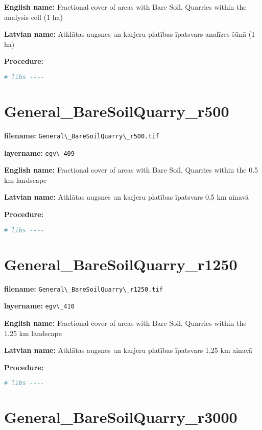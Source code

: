 \documentclass[
]{book}
\newcommand{\passthrough}[1]{#1}
\begin{document}
\textbf{English name:} Fractional cover of areas with Bare Soil, Quarries within the analysis cell (1 ha)

\textbf{Latvian name:} Atklātas augsnes un karjeru platības īpatsvars analīzes šūnā (1 ha)

\textbf{Procedure:}

\begin{lstlisting}[language=R]
# libs ----
\end{lstlisting}

\section{General\_BareSoilQuarry\_r500}\label{ch06.409}

\textbf{filename:} \passthrough{\lstinline!General\_BareSoilQuarry\_r500.tif!}

\textbf{layername:} \passthrough{\lstinline!egv\_409!}

\textbf{English name:} Fractional cover of areas with Bare Soil, Quarries within the 0.5 km landscape

\textbf{Latvian name:} Atklātas augsnes un karjeru platības īpatsvars 0,5 km ainavā

\textbf{Procedure:}

\begin{lstlisting}[language=R]
# libs ----
\end{lstlisting}

\section{General\_BareSoilQuarry\_r1250}\label{ch06.410}

\textbf{filename:} \passthrough{\lstinline!General\_BareSoilQuarry\_r1250.tif!}

\textbf{layername:} \passthrough{\lstinline!egv\_410!}

\textbf{English name:} Fractional cover of areas with Bare Soil, Quarries within the 1.25 km landscape

\textbf{Latvian name:} Atklātas augsnes un karjeru platības īpatsvars 1,25 km ainavā

\textbf{Procedure:}

\begin{lstlisting}[language=R]
# libs ----
\end{lstlisting}

\section{General\_BareSoilQuarry\_r3000}\label{ch06.411}
\end{document}
